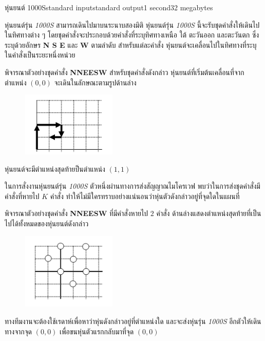 \documentclass[11pt,a4paper]{article}
\begin{document}
\begin{problem}{หุ่นยนต์ 1000S}{standard input}{standard output}{1 second}{32 megabytes}


หุ่นยนต์รุ่น \textit{1000S} สามารถเดินไปมาบนระนาบสองมิติ  หุ่นยนต์รุ่น \textit{1000S} นี้จะรับชุดคำสั่งให้เดินไปในทิศทางต่าง ๆ  โดยชุดคำสั่งจะประกอบด้วยคำสั่งที่ระบุทิศทางเหนือ ใต้ ตะวันออก และตะวันตก ซึ่งระบุด้วยอักษร \textbf{N S E }และ \textbf{W} ตามลำดับ สำหรับแต่ละคำสั่ง หุ่นยนต์จะเคลื่อนไปในทิศทางที่ระบุในคำสั่งเป็นระยะหนึ่งหน่วย

พิจารณาตัวอย่างชุดคำสั่ง \textbf{NNEESW} สำหรับชุดคำสั่งดังกล่าว หุ่นยนต์ที่เริ่มต้นเคลื่อนที่จากตำแหน่ง $(0,0)$ จะเดินในลักษณะตามรูปด้านล่าง

\begin{figure}[!h]
\centering
\includegraphics[width=0.4\textwidth]{../latex/img/1167/1167-1.png}
\end{figure}
หุ่นยนต์จะมีตำแหน่งสุดท้ายป็นตำแหน่ง $(1,1)$

                ในการสั่งงานหุ่นยนต์รุ่น \textit{1000S} ตัวหนึ่งผ่านทางการส่งสัญญาณไมโครเวฟ พบว่าในการส่งชุดคำสั่งมีคำสั่งที่หายไป $K$ คำสั่ง  ทำให้ไม่มีใครทราบอย่างแน่นอนว่าหุ่นตัวดังกล่าวอยู่ที่จุดใดในแผนที่

                พิจารณาตัวอย่างชุดคำสั่ง \textbf{NNEESW} ที่มีคำสั่งหายไป $2$ คำสั่ง  ด้านล่างแสดงตำแหน่งสุดท้ายที่เป็นไปได้ทั้งหมดของหุ่นยนต์ดังกล่าว

\begin{figure}[!h]
\centering
\includegraphics[width=0.4\textwidth]{../latex/img/1167/1167-2.png}
\end{figure}


ทางทีมงานจะต้องใช้เรดาห์เพื่อหาว่าหุ่นดังกล่าวอยู่ที่ตำแหน่งใด  และจะส่งหุ่นรุ่น \textit{1000S} อีกตัวให้เดินทางจากจุด $(0,0)$ เพื่อขนหุ่นตัวแรกกลับมาที่จุด $(0,0)$


\end{problem}
\end{document}
